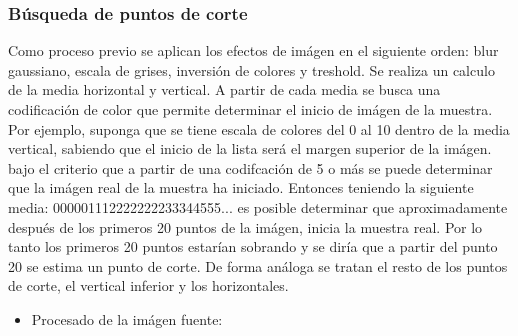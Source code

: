 \subsubsection{B\'usqueda de puntos de corte}
Como proceso previo se aplican los efectos de im\'agen en el siguiente orden: blur gaussiano, escala de grises, inversi\'on de colores y treshold. Se realiza un calculo de la media horizontal y vertical. A partir de cada media se busca una codificaci\'on de color que permite determinar el inicio de im\'agen de la muestra. Por ejemplo, suponga que se tiene escala de colores del 0 al 10 dentro de la media vertical, sabiendo que el inicio de la lista ser\'a el margen superior de la im\'agen. bajo el criterio que a partir de una codifcaci\'on de 5 o m\'as se puede determinar que la im\'agen real de la muestra ha iniciado. Entonces teniendo la siguiente media: 000001112222222233344555... es posible determinar que aproximadamente despu\'es de los primeros 20 puntos de la im\'agen, inicia la muestra real. Por lo tanto los primeros 20 puntos estar\'ian sobrando y se dir\'ia que a partir del punto 20 se estima un punto de corte. De forma an\'aloga se tratan el resto de los puntos de corte, el vertical inferior y los horizontales.

\begin{itemize}
	\item Procesado de la im\'agen fuente:
\end{itemize}

